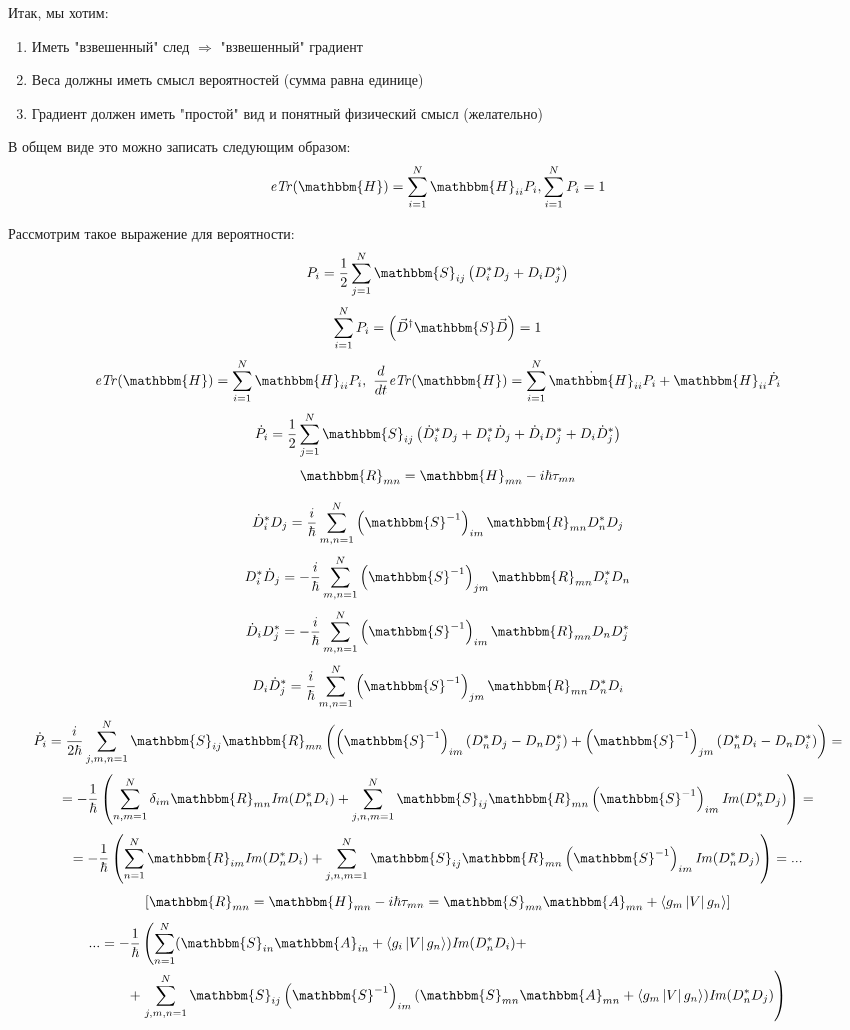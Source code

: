 Итак, мы хотим:
\begin{enumerate}
\item Иметь "взвешенный" след $\Rightarrow$ "взвешенный" градиент
\item Веса должны иметь смысл вероятностей (сумма равна единице)
\item Градиент должен иметь "простой" вид и понятный физический смысл (желательно)
\end{enumerate}

В общем виде это можно записать следующим образом:
$$\mathit{eTr}(\mathbbm{H})=\sum_{i=1}^N\mathbbm{H}_{ii}P_i, \sum_{i=1}^NP_i=1$$

Рассмотрим такое выражение для вероятности:
$$P_i=\frac{1}{2}\sum_{j=1}^N\mathbbm{S}_{ij}\left(D_i^*D_j+D_iD_j^*\right)$$
$$\sum_{i=1}^NP_i=\left(\vec{D}^{\dagger}\mathbbm{S}\vec{D}\right)=1$$
$$\mathit{eTr}(\mathbbm{H})=\sum_{i=1}^N\mathbbm{H}_{ii}P_i,\ %
  \frac{d}{dt}\mathit{eTr}(\mathbbm{H})=\sum_{i=1}^N\dot{\mathbbm{H}}_{ii}P_i+%
						    \mathbbm{H}_{ii}\dot{P}_i$$
$$\dot{P}_i=\frac{1}{2}\sum_{j=1}^N\mathbbm{S}_{ij}\left(\dot{D}_i^*D_j+%
							 D_i^*\dot{D}_j+%
							 \dot{D}_iD_j^*+%
							 D_i\dot{D}_j^*%
						    \right)$$
$$\mathbbm{R}_{mn}=\mathbbm{H}_{mn}-i\hbar\tau_{mn}$$

$$\dot{D}_i^*D_j=\frac{i}{\hbar}\sum_{m,n=1}^N\left(\mathbbm{S}^{-1}\right)_{im}%
						    \mathbbm{R}_{mn}D_n^*D_j$$
$$D_i^*\dot{D}_j=-\frac{i}{\hbar}\sum_{m,n=1}^N\left(\mathbbm{S}^{-1}\right)_{jm}%
						     \mathbbm{R}_{mn}D_i^*D_n$$
$$\dot{D}_iD_j^*=-\frac{i}{\hbar}\sum_{m,n=1}^N\left(\mathbbm{S}^{-1}\right)_{im}%
						     \mathbbm{R}_{mn}D_nD_j^*$$
$$D_i\dot{D}_j^*=\frac{i}{\hbar}\sum_{m,n=1}^N\left(\mathbbm{S}^{-1}\right)_{jm}%
						    \mathbbm{R}_{mn}D_n^*D_i$$
$$\dot{P}_i=\frac{i}{2\hbar}\sum_{j,m,n=1}^N\mathbbm{S}_{ij}\mathbbm{R}_{mn}%
					    \left(\left(\mathbbm{S}^{-1}\right)_{im}(D_n^*D_j-D_nD_j^*)+%
					          \left(\mathbbm{S}^{-1}\right)_{jm}(D_n^*D_i-D_nD_i^*)\right)=$$
$$=-\frac{1}{\hbar}\left(\sum_{n,m=1}^N\delta_{im}\mathbbm{R}_{mn}\mathit{Im}(D_n^*D_i)+%
			 \sum_{j,n,m=1}^N\mathbbm{S}_{ij}\mathbbm{R}_{mn}%
					 \left(\mathbbm{S}^{-1}\right)_{im}\mathit{Im}(D_n^*D_j)\right)=$$
$$=-\frac{1}{\hbar}\left(\sum_{n=1}^N\mathbbm{R}_{im}\mathit{Im}(D_n^*D_i)+%
			 \sum_{j,n,m=1}^N\mathbbm{S}_{ij}\mathbbm{R}_{mn}%
					 \left(\mathbbm{S}^{-1}\right)_{im}\mathit{Im}(D_n^*D_j)\right)=...$$
$$\left[\mathbbm{R}_{mn}=%
  \mathbbm{H}_{mn}-i\hbar\tau_{mn}=\mathbbm{S}_{mn}\mathbbm{A}_{mn}+\mymean{g_m}{V}{g_n}\right]$$
\begin{align*}
...=-\frac{1}{\hbar}&\left(\sum_{n=1}^N(\mathbbm{S}_{in}\mathbbm{A}_{in}+\mymean{g_i}{V}{g_n})\mathit{Im}(D_n^*D_i)+\right.\\
+&\left.		   \sum_{j,m,n=1}^N\mathbbm{S}_{ij}\left(\mathbbm{S}^{-1}\right)_{im}%
					    (\mathbbm{S}_{mn}\mathbbm{A}_{mn}+\mymean{g_m}{V}{g_n})\mathit{Im}(D_n^*D_j)\right)
\end{align*}

